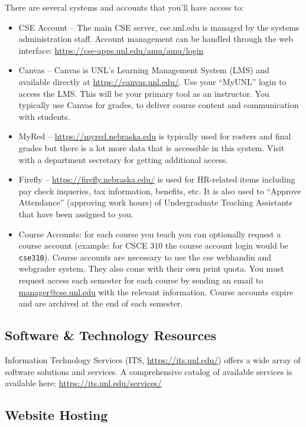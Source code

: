 \documentclass[12pt]{scrartcl}
\begin{document}
There are several systems and accounts that you'll have access
to:

\begin{itemize}
  \item CSE Account -- The main CSE server, cse.unl.edu is managed
  by the systems administration staff.  Account management can be
  handled through the web interface:  \url{https://cse-apps.unl.edu/amu/amu/login}
  \item Canvas -- Canvas is UNL's Learning Management System (LMS) 
  and available directly at \url{https://canvas.unl.edu/}.  Use
  your ``MyUNL'' login to access the LMS.  This will be your primary
  tool as an instructor.  You typically use Canvas for grades, to
  deliver course content and communication with students.
  \item MyRed -- \url{https://myred.nebraska.edu} is typically used
  for rosters and final grades but there is a lot more data that
  is accessible in this system.  Visit with a department secretary 
  for getting additional access.
  \item Firefly -- \url{https://firefly.nebraska.edu/} is used for
  HR-related items including pay check inqueries, tax information, 
  benefits, etc.  It is also used to ``Approve Attendance'' 
  (approving work hours) of Undergraduate Teaching Assistants 
  that have been assigned to you.
  \item Course Accounts: for each course you teach you can optionally
  request a course account (example: for CSCE 310 the course account
  login would be \texttt{cse310}).  Course accounts are
  necessary to use the cse webhandin and webgrader system.  They also
  come with their own print quota.  You must request access each
  semester for each course by sending an email to 
  \href{mailto:manager@cse.unl.edu}{manager@cse.unl.edu} with the
  relevant information.  Course accounts expire and are
  archived at the end of each semester.
\end{itemize}

\subsection{Software \& Technology Resources}

Information Technology Services (ITS, \url{https://its.unl.edu/}) 
offers a wide array of software solutions and services.  A
comprehensive catalog of available services is available here:
\url{https://its.unl.edu/services/}

\subsection{Website Hosting}
\end{document}
